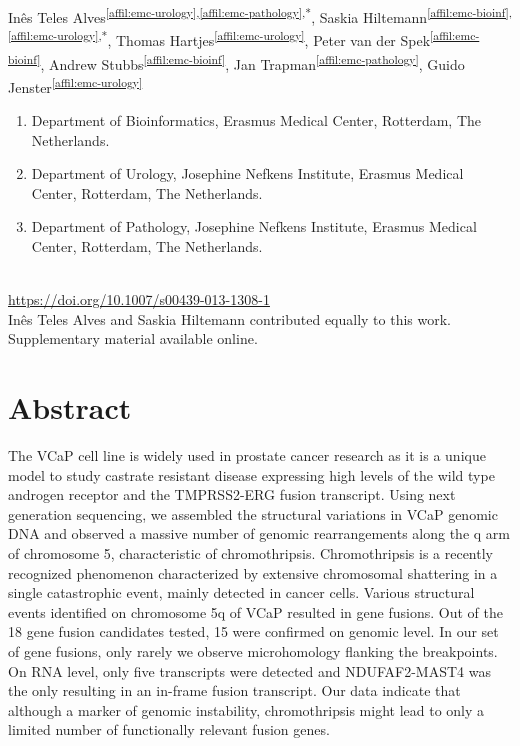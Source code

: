 \setcounter{NAT@ctr}{-1}
Inês Teles Alves\textsuperscript{\ref{affil:emc-urology},\ref{affil:emc-pathology},*},
Saskia Hiltemann\textsuperscript{\ref{affil:emc-bioinf},\ref{affil:emc-urology},*},
Thomas Hartjes\textsuperscript{\ref{affil:emc-urology}},
Peter van der Spek\textsuperscript{\ref{affil:emc-bioinf}},
Andrew Stubbs\textsuperscript{\ref{affil:emc-bioinf}},
Jan Trapman\textsuperscript{\ref{affil:emc-pathology}},
Guido Jenster\textsuperscript{\ref{affil:emc-urology}}

\small
\begin{enumerate}
\itemsep-0.5em
\item Department of Bioinformatics, Erasmus Medical Center, Rotterdam, The Netherlands.\label{affil:emc-bioinf}
\item Department of Urology, Josephine Nefkens Institute, Erasmus Medical Center, Rotterdam, The Netherlands.\label{affil:emc-urology}
\item Department of Pathology, Josephine Nefkens Institute, Erasmus Medical Center, Rotterdam, The Netherlands.\label{affil:emc-pathology}
\end{enumerate}


{\color{chaptergrey}{Published in: Human Genetics}} \\
{\color{chaptergrey}{DOI:}} \url{https://doi.org/10.1007/s00439-013-1308-1} \\
{\color{chaptergrey}{*:}} Inês Teles Alves and Saskia Hiltemann contributed equally to this work.\\
Supplementary material available online. \\

\normalsize

\section*{Abstract}
The VCaP cell line is widely used in prostate cancer research as it is a unique model to study castrate resistant disease expressing high levels of
the wild type androgen receptor and the TMPRSS2-ERG fusion transcript. Using next generation sequencing, we assembled the structural variations in
VCaP genomic DNA and observed a massive number of genomic rearrangements along the q arm of chromosome 5, characteristic of chromothripsis.
Chromothripsis is a recently recognized phenomenon characterized by extensive chromosomal shattering in a single catastrophic event, mainly detected
in cancer cells. Various structural events identified on chromosome 5q of VCaP resulted in gene fusions. Out of the 18 gene fusion candidates tested,
15 were confirmed on genomic level. In our set of gene fusions, only rarely we observe microhomology flanking the breakpoints. On RNA level, only five
transcripts were detected and NDUFAF2-MAST4 was the only resulting in an in-frame fusion transcript. Our data indicate that although a marker of genomic
instability, chromothripsis might lead to only a limited number of functionally relevant fusion genes.


